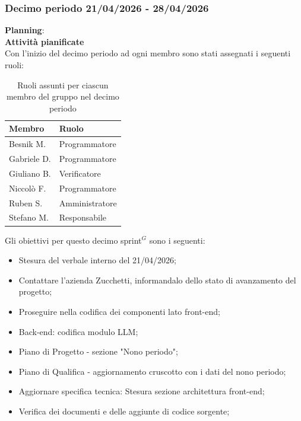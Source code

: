 \documentclass[a4paper,10pt]{article}
\begin{document}
\subsubsection{Decimo periodo 21/04/2026 - 28/04/2026}
\textbf{Planning}: \\
\textbf{Attività pianificate} \\ Con l'inizio del decimo periodo ad ogni membro sono stati assegnati i seguenti ruoli:
\begin{table}[H]
\centering
\begin{tabular}{|l|l|}
\hline
\textbf{Membro} & \textbf{Ruolo} \\
\hline
Besnik M.  & Programmatore \\
\hline
Gabriele D.  & Programmatore \\
\hline
Giuliano B. & Verificatore \\
\hline
Niccolò F. & Programmatore \\
\hline
Ruben S. & Amministratore \\
\hline
Stefano M.  & Responsabile \\
\hline
\end{tabular}
\caption{Ruoli assunti per ciascun membro del gruppo nel decimo periodo}
\end{table}

Gli obiettivi per questo decimo sprint$^G$ sono i seguenti:
\begin{itemize}
  \item Stesura del verbale interno del 21/04/2026;
  \item Contattare l'azienda Zucchetti, informandalo dello stato di avanzamento del progetto;
  \item Proseguire nella codifica dei componenti lato front-end;
  \item Back-end: codifica modulo LLM;
  \item Piano di Progetto - sezione "Nono periodo";
  \item Piano di Qualifica - aggiornamento cruscotto con i dati del nono periodo;
  \item Aggiornare specifica tecnica: Stesura sezione architettura front-end;
  \item Verifica dei documenti e delle aggiunte di codice sorgente;
\end{itemize}
\end{document}
